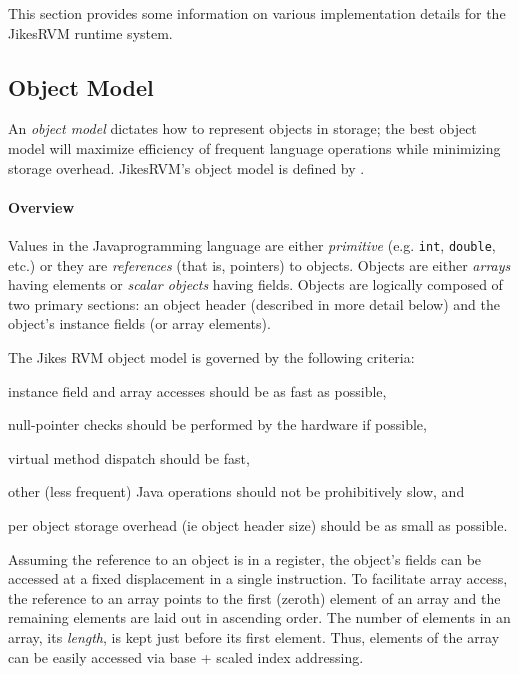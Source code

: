 This section provides some information on various
implementation details for the Jikes\trademark RVM runtime system.


\subsection{Object Model} \label{sssec:objects}
An {\em object model} dictates how to represent objects in storage;
the best object model will maximize efficiency of frequent language
operations while minimizing storage overhead. Jikes\trademark RVM's
object model 
is defined by .

\paragraph{Overview}
Values in the Java\trademark programming language are either {\em
primitive} (e.g. {\tt int}, {\tt double}, etc.)  or they are {\em
references} (that is, pointers) to objects.  Objects are either {\em
arrays} having elements or {\em scalar objects} having fields.
Objects are logically composed of two primary sections: an object
header (described in more detail below) and the object's instance
fields (or array elements). 

The Jikes RVM object model is governed by the following criteria:
\begin{description}
\item{}
instance field and array accesses should be as fast as possible,
\item{}
null-pointer checks should be performed by the hardware if possible, 
\item{}
virtual method dispatch should be fast,
\item{}
other (less frequent) Java operations should not be prohibitively
slow, and
\item{}
per object storage overhead (ie object header size) should be as small
as possible.
\end{description}

Assuming the reference to an object is in a register, the object's
fields can be accessed at a fixed displacement in a single
instruction.  To facilitate array access, the reference to an array
points to the first (zeroth) element of an array and the remaining
elements are laid out in ascending order.  The number of elements in
an array, its {\em length}, is kept just before its first
element. Thus, elements of the array can be easily accessed via base +
scaled index addressing.


